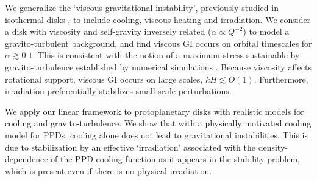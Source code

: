 
We generalize the `viscous gravitational instability', previously 
studied in isothermal disks
\citep{lynden-bell74,willerding92,gammie96}, to include 
cooling, viscous heating and irradiation. %
We consider a disk with viscosity and self-gravity inversely
related ($\alpha\propto Q^{-2}$) to model a 
gravito-turbulent background, and find viscous GI occurs on orbital
timescales for $\alpha\gtrsim 0.1$. This is consistent with the notion 
of a maximum stress sustainable by gravito-turbulence established 
by numerical simulations \citep{rice05}. Because viscosity affects 
rotational support, viscous GI occurs on large scales, $kH\lesssim
O(1)$.  Furthermore, irradiation preferentially
stabilizes small-scale perturbations. %
                             

We apply our linear framework to protoplanetary disks with 
realistic models for cooling and gravito-turbulence. 
We show that with a physically motivated cooling model for PPDs, 
cooling alone does not lead to gravitational instabilities. This is
due to stabilization by an effective `irradiation' associated with the 
density-dependence of the PPD cooling function as it appears in the
stability problem, which is present even if there is no physical
irradiation.  




